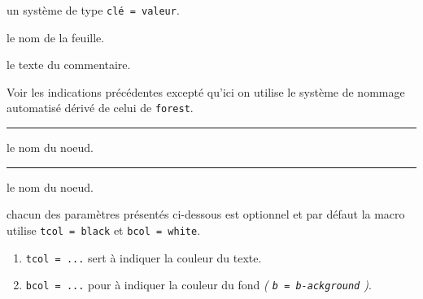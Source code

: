 \documentclass[12pt,a4paper]{article}
\theoremstyle{definition}
\newcommand\separation{
    \medskip
    \hfill\rule{0.5\textwidth}{0.75pt}\hfill
    \medskip
}
\newcommand\extraspace{
    \vspace{0.25em}
}
\newcommand\mwhyprefix[2]{%
    \texttt{#1 = #1-#2}%
}
\begin{document}
\IDoption{} un système de type \texttt{clé = valeur}.


 le nom de la feuille.

 le texte du commentaire.


\bigskip



\extraspace
\extraspace

Voir les indications précédentes excepté qu'ici on utilise le système de nommage automatisé dérivé de celui de \verb#forest#.




\separation



\IDarg{} le nom du noeud.


%
%
%
%




\separation



 le nom du noeud.

 chacun des paramètres présentés ci-dessous est optionnel et par défaut la macro utilise \verb#tcol = black# et \verb#bcol = white#.

\begin{enumerate}
	\item \verb#tcol = ...# sert à indiquer la couleur du texte.

	\item \verb#bcol = ...# pour à indiquer la couleur du fond \emph{(\mwhyprefix{b}{ackground})}.
\end{enumerate}
\end{document}
